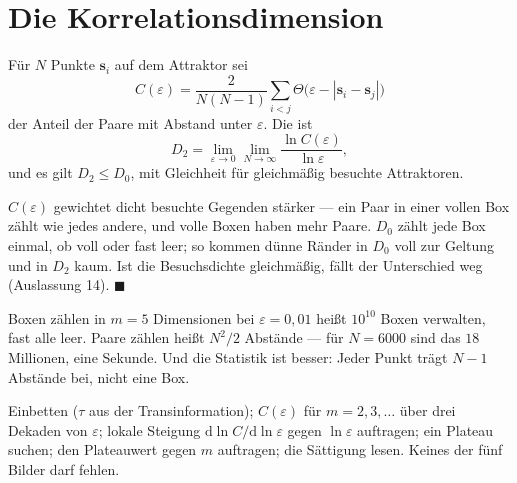 \section{Die Korrelationsdimension}

\begin{merksatz}
Für $N$ Punkte $\mathbf s_i$ auf dem Attraktor sei
\[ C(\varepsilon) = \frac{2}{N(N-1)}\sum_{i<j}\Theta\bigl(\varepsilon - |\mathbf s_i - \mathbf s_j|\bigr) \]
der Anteil der Paare mit Abstand unter $\varepsilon$. Die  ist
\[ D_2 = \lim_{\varepsilon\to0}\lim_{N\to\infty}\frac{\ln C(\varepsilon)}{\ln\varepsilon} , \]
und es gilt $D_2 \le D_0$, mit Gleichheit für gleichmäßig besuchte Attraktoren.

$C(\varepsilon)$ gewichtet dicht besuchte Gegenden stärker --- ein Paar in einer vollen Box zählt wie jedes andere, und volle Boxen haben mehr Paare. $D_0$ zählt jede Box einmal, ob voll oder fast leer; so kommen dünne Ränder in $D_0$ voll zur Geltung und in $D_2$ kaum. Ist die Besuchsdichte gleichmäßig, fällt der Unterschied weg (Auslassung 14). $\blacksquare$

Boxen zählen in $m = 5$ Dimensionen bei $\varepsilon = 0{,}01$ heißt $10^{10}$ Boxen verwalten, fast alle leer. Paare zählen heißt $N^{2}/2$ Abstände --- für $N = 6000$ sind das $18$ Millionen, eine Sekunde. Und die Statistik ist besser: Jeder Punkt trägt $N - 1$ Abstände bei, nicht eine Box.

Einbetten ($\tau$ aus der Transinformation); $C(\varepsilon)$ für $m = 2, 3, \ldots$ über drei Dekaden von $\varepsilon$; lokale Steigung $\mathrm d\ln C/\mathrm d\ln\varepsilon$ gegen $\ln\varepsilon$ auftragen; ein Plateau suchen; den Plateauwert gegen $m$ auftragen; die Sättigung lesen. Keines der fünf Bilder darf fehlen.

\begin{center}
\begin{minipage}{0.88\textwidth}
\end{minipage}
\end{center}
\end{merksatz}

